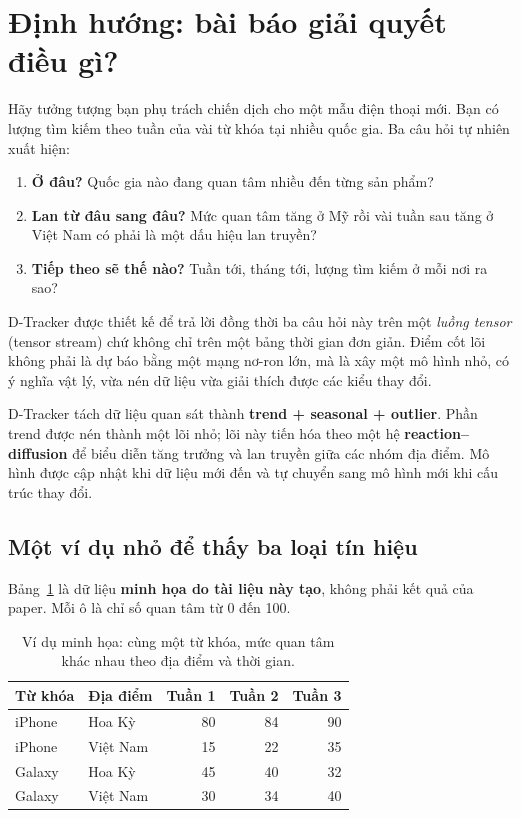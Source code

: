 \section{Định hướng: bài báo giải quyết điều gì?}
\label{sec:orientation}

Hãy tưởng tượng bạn phụ trách chiến dịch cho một mẫu điện thoại mới. Bạn có lượng tìm kiếm
theo tuần của vài từ khóa tại nhiều quốc gia. Ba câu hỏi tự nhiên xuất hiện:

\begin{enumerate}
  \item \textbf{Ở đâu?} Quốc gia nào đang quan tâm nhiều đến từng sản phẩm?
  \item \textbf{Lan từ đâu sang đâu?} Mức quan tâm tăng ở Mỹ rồi vài tuần sau tăng ở Việt Nam
        có phải là một dấu hiệu lan truyền?
  \item \textbf{Tiếp theo sẽ thế nào?} Tuần tới, tháng tới, lượng tìm kiếm ở mỗi nơi ra sao?
\end{enumerate}

D-Tracker được thiết kế để trả lời đồng thời ba câu hỏi này trên một \emph{luồng tensor}
(tensor stream) chứ không chỉ trên một bảng thời gian đơn giản. Điểm cốt lõi không phải là
dự báo bằng một mạng nơ-ron lớn, mà là xây một mô hình nhỏ, có ý nghĩa vật lý, vừa nén dữ liệu
vừa giải thích được các kiểu thay đổi.

\begin{keypoint}
D-Tracker tách dữ liệu quan sát thành \textbf{trend + seasonal + outlier}. Phần trend được nén
thành một lõi nhỏ; lõi này tiến hóa theo một hệ \textbf{reaction--diffusion} để biểu diễn tăng
trưởng và lan truyền giữa các nhóm địa điểm. Mô hình được cập nhật khi dữ liệu mới đến và tự
chuyển sang mô hình mới khi cấu trúc thay đổi.
\end{keypoint}

\subsection{Một ví dụ nhỏ để thấy ba loại tín hiệu}

Bảng~\ref{tab:running-example} là dữ liệu \textbf{minh họa do tài liệu này tạo}, không phải kết
quả của paper. Mỗi ô là chỉ số quan tâm từ 0 đến 100.

\begin{table}[htbp]
  \centering
  \small
  \caption{Ví dụ minh họa: cùng một từ khóa, mức quan tâm khác nhau theo địa điểm và thời gian.}
  \label{tab:running-example}
  \begin{tabular}{llrrr}
    \toprule
    Từ khóa & Địa điểm & Tuần 1 & Tuần 2 & Tuần 3 \\
    \midrule
    iPhone & Hoa Kỳ & 80 & 84 & 90 \\
    iPhone & Việt Nam & 15 & 22 & 35 \\
    Galaxy & Hoa Kỳ & 45 & 40 & 32 \\
    Galaxy & Việt Nam & 30 & 34 & 40 \\
    \bottomrule
  \end{tabular}
\end{table}

